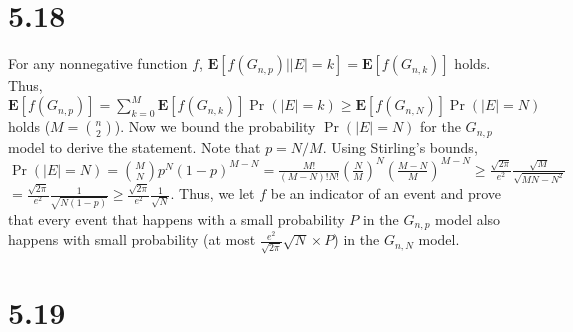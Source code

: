 \documentclass{article}
\begin{document}
\section*{5.18}
For any nonnegative function $f$, $\textbf{E}[f(G_{n,p})||E|=k]=\textbf{E}[f(G_{n,k})]$ holds.\\
Thus, $\textbf{E}[f(G_{n,p})]=\sum\limits_{k=0}^M\textbf{E}[f(G_{n,k})]\Pr(|E|=k) \geq \textbf{E}[f(G_{n,N})]\Pr(|E|=N)$ holds ($M=\binom{n}{2}$).
Now we bound the probability $\Pr(|E|=N)$ for the $G_{n,p}$ model to derive the statement.
Note that $p=N/M$. Using Stirling's bounds,\\
$\Pr(|E|=N)=\binom{M}{N}p^N(1-p)^{M-N}=\frac{M!}{(M-N)!N!}(\frac{N}{M})^N(\frac{M-N}{M})^{M-N}\geq \frac{\sqrt{2\pi}}{e^2}\frac{\sqrt{M}}{\sqrt{MN-N^2}}$
$=\frac{\sqrt{2\pi}}{e^2}\frac{1}{\sqrt{N(1-p)}}\geq\frac{\sqrt{2\pi}}{e^2}\frac{1}{\sqrt{N}}$.
Thus, we let $f$ be an indicator of an event and prove that every event that happens with a small probability $P$ in the $G_{n,p}$ model also happens with small probability (at most $\frac{e^2}{\sqrt{2\pi}}\sqrt{N}\times P$) in the $G_{n,N}$ model.
\section*{5.19}
\end{document}
